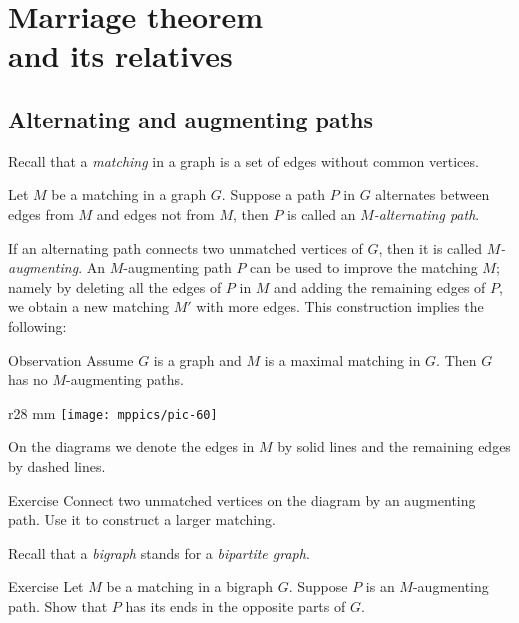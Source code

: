 \chapter[Marriage theorem and its relatives]{Marriage theorem\\ and its relatives}

\section{Alternating and augmenting paths}

Recall that a \emph{matching} in a graph is a set of edges without common vertices. 

Let $M$ be a matching in a graph $G$.
Suppose a path $P$ in $G$ alternates between edges from $M$ and edges not from $M$,
then $P$ is called an \emph{$M$-alternating path}.

If an alternating path connects two unmatched vertices of $G$, then it is called \emph{$M$-augmenting}.
An $M$-augmenting path $P$ can be used to improve the matching $M$;
namely by deleting all the edges of $P$ in $M$
and adding the remaining edges of $P$, we obtain a new matching $M'$ with more edges.
This construction implies the following:

\begin{thm}{Observation}\label{obs:augmenting}
Assume $G$ is a graph and $M$ is a maximal matching in $G$.
Then $G$ has no $M$-augmenting paths.
\end{thm} 

\begin{wrapfigure}[5]{r}{28 mm}
\vskip-4mm
\centering
\texttt{[image: mppics/pic-60]}
\vskip-0mm
\end{wrapfigure}

On the diagrams we denote the edges in $M$ by solid lines and the remaining edges by dashed lines.

\begin{thm}{Exercise}\label{ex:augmenting-path}
Connect two unmatched vertices on the diagram by an augmenting path.
Use it to construct a larger matching.
\end{thm}

Recall that a \emph{bigraph} stands for a \emph{bipartite graph}.

\begin{thm}{Exercise}\label{ex:bigraph-matching}
Let $M$ be a matching in a bigraph $G$.
Suppose $P$ is an $M$-augmenting path.
Show that $P$ has its ends in the opposite parts of $G$.
\end{thm}

